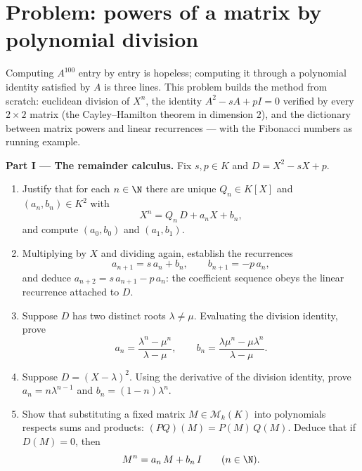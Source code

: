 \section{Problem: powers of a matrix by polynomial division}

\begin{problem}\label{pb:b1:matrices:1}
Computing $A^{100}$ entry by entry is hopeless; computing it
through a polynomial identity satisfied by $A$ is three lines.
This problem builds the method from scratch: euclidean division
of $X^n$, the identity $A^2 - sA + pI = 0$ verified by every $2
\times 2$ matrix (the Cayley--Hamilton theorem in dimension
$2$), and the dictionary between matrix powers and linear
recurrences --- with the Fibonacci numbers as running example.

\medskip
\noindent\textbf{Part I --- The remainder calculus.} Fix $s, p
\in K$ and $D = X^2 - sX + p$.
\begin{enumerate}
  \item Justify that for each $n \in \N$ there are unique $Q_n
        \in K[X]$ and $(a_n, b_n) \in K^2$ with
        \[
        X^n = Q_n\,D + a_n X + b_n ,
        \]
        and compute $(a_0, b_0)$ and $(a_1, b_1)$.
  \item Multiplying by $X$ and dividing again, establish the
        recurrences
        \[
        a_{n+1} = s\,a_n + b_n,
        \qquad
        b_{n+1} = -p\,a_n ,
        \]
        and deduce $a_{n+2} = s\,a_{n+1} - p\,a_n$: the
        coefficient sequence obeys the linear recurrence attached
        to $D$.
  \item Suppose $D$ has two distinct roots $\lambda \neq \mu$.
        Evaluating the division identity, prove
        \[
        a_n = \frac{\lambda^n - \mu^n}{\lambda - \mu},
        \qquad
        b_n = \frac{\lambda\mu^n - \mu\lambda^n}{\lambda - \mu} .
        \]
  \item Suppose $D = (X - \lambda)^2$. Using the derivative of
        the division identity, prove $a_n = n\lambda^{n-1}$ and
        $b_n = (1 - n)\lambda^{n}$.
  \item Show that substituting a fixed matrix $M \in
        \mathcal{M}_k(K)$ into polynomials respects sums and
        products: $(PQ)(M) = P(M)\,Q(M)$. Deduce that if $D(M) =
        0$, then
        \[
        M^n = a_n\,M + b_n\,I \qquad (n \in \N).
        \]
\end{enumerate}


\end{problem}
